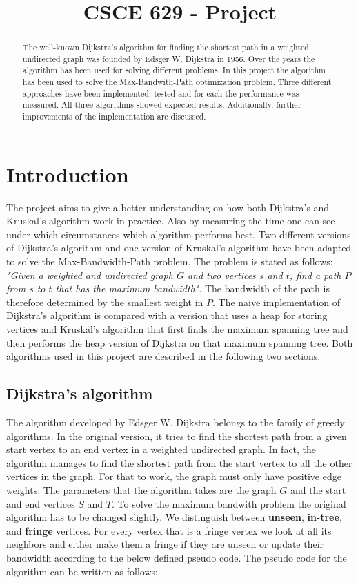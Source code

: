 \documentclass{article}
\title{CSCE 629 - Project }
\begin{document}
\maketitle

\begin{abstract}
The well-known Dijkstra's algorithm for finding the shortest path in a weighted undirected graph was founded by Edsger W. Dijkstra in 1956. Over the years the algorithm has been used for solving different problems. In this project the algorithm has been used to solve the Max-Bandwith-Path optimization problem. Three different approaches have been implemented, tested and for each the performance was measured. All three algorithms showed expected results. Additionally, further improvements of the implementation are discussed.
\end{abstract}

\section{Introduction}
The project aims to give a better understanding on how both Dijkstra's and Kruskal's algorithm work in practice. Also by measuring the time one can see under which circumstances which algorithm performs best. Two different versions of Dijkstra's algorithm and one version of Kruskal's algorithm have been adapted to solve the Max-Bandwidth-Path problem. The problem is stated as follows: \textit{"Given a weighted and undirected graph $G$ and two vertices $s$ and $t$, find a path $P$ from $s$ to $t$ that has the maximum bandwidth"}. The bandwidth of the path is therefore determined by the smallest weight in $P$. The naive implementation of Dijkstra's algorithm is compared with a version that uses a heap for storing vertices and Kruskal's algorithm that first finds the maximum spanning tree and then performs the heap version of Dijkstra on that maximum spanning tree. Both algorithms used in this project are described in the following two sections.

\subsection{Dijkstra's algorithm}
The algorithm developed by Edsger W. Dijkstra belongs to the family of greedy algorithms. In the original version, it tries to find the shortest path from a given start vertex to an end vertex in a weighted undirected graph. In fact, the algorithm manages to find the shortest path from the start vertex to all the other vertices in the graph. For that to work, the graph must only have positive edge weights. The parameters that the algorithm takes are the graph $G$ and the start and end vertices $S$ and $T$. To solve the maximum bandwith problem the original algorithm has to be changed slightly. We distinguish between \textbf{unseen}, \textbf{in-tree}, and \textbf{fringe} vertices. For every vertex that is a fringe vertex we look at all its neighbors and either make them a fringe if they are unseen or update their bandwidth according to the below defined pseudo code. The pseudo code for the algorithm can be written as follows:\\
\end{document}
